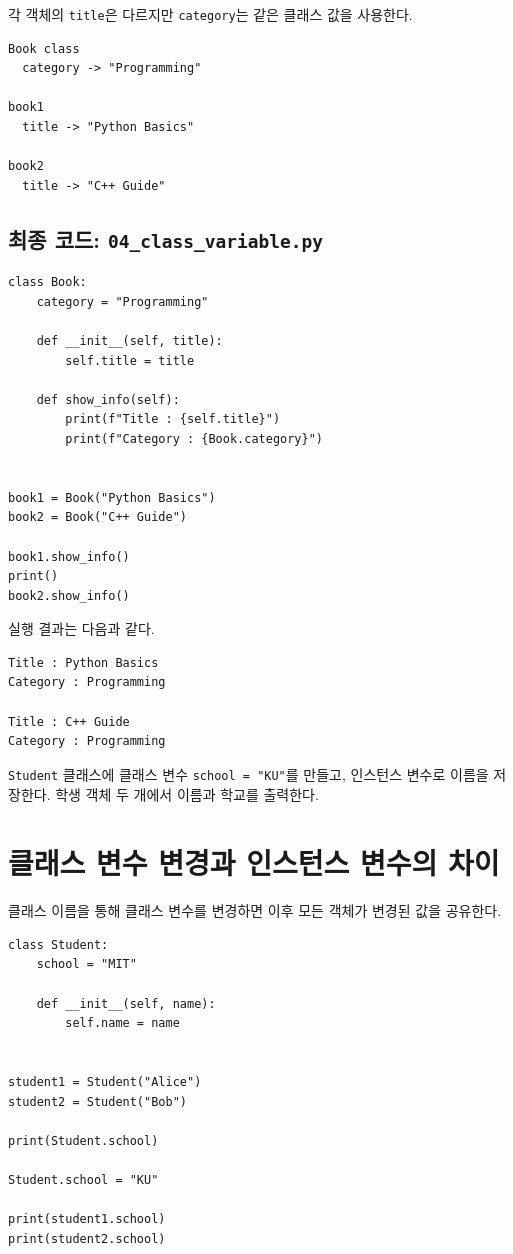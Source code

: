 \documentclass[11pt,a4paper]{article}
\begin{document}
각 객체의 \texttt{title}은 다르지만 \texttt{category}는 같은 클래스 값을 사용한다.

\begin{verbatim}
Book class
  category -> "Programming"

book1
  title -> "Python Basics"

book2
  title -> "C++ Guide"
\end{verbatim}

\subsection{최종 코드: \texttt{04\_class\_variable.py}}

\begin{lstlisting}
class Book:
    category = "Programming"

    def __init__(self, title):
        self.title = title

    def show_info(self):
        print(f"Title : {self.title}")
        print(f"Category : {Book.category}")


book1 = Book("Python Basics")
book2 = Book("C++ Guide")

book1.show_info()
print()
book2.show_info()
\end{lstlisting}

실행 결과는 다음과 같다.

\begin{verbatim}
Title : Python Basics
Category : Programming

Title : C++ Guide
Category : Programming
\end{verbatim}

\begin{practicebox}
\texttt{Student} 클래스에 클래스 변수 \texttt{school = "KU"}를 만들고, 인스턴스 변수로 이름을 저장한다. 학생 객체 두 개에서 이름과 학교를 출력한다.
\end{practicebox}

\section{클래스 변수 변경과 인스턴스 변수의 차이}

클래스 이름을 통해 클래스 변수를 변경하면 이후 모든 객체가 변경된 값을 공유한다.

\begin{lstlisting}
class Student:
    school = "MIT"

    def __init__(self, name):
        self.name = name


student1 = Student("Alice")
student2 = Student("Bob")

print(Student.school)

Student.school = "KU"

print(student1.school)
print(student2.school)
\end{lstlisting}
\end{document}
